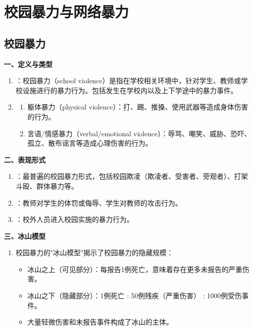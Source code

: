 \section{校园暴力与网络暴力}

\subsection{校园暴力}

\begin{keybox}
\textbf{一、定义与类型}
\begin{enumerate}[leftmargin=*]
    \item {}：校园暴力（school violence）是指在学校相关环境中，针对学生、教师或学校设施进行的暴力行为。包括发生在学校内以及上下学途中的暴力事件。
    \item {}
    \begin{enumerate}
        \item 躯体暴力（physical violence）：打、踢、推搡、使用武器等造成身体伤害的行为。
        \item 言语/情感暴力（verbal/emotional violence）：辱骂、嘲笑、威胁、恐吓、孤立、散布谣言等造成心理伤害的行为。
    \end{enumerate}
\end{enumerate}

\textbf{二、表现形式}
\begin{enumerate}[leftmargin=*]
    \item {}：最普遍的校园暴力形式，包括校园欺凌（欺凌者、受害者、旁观者）、打架斗殴、群体暴力等。
    \item {}：教师对学生的体罚或侮辱、学生对教师的攻击行为。
    \item {}：校外人员进入校园实施的暴力行为。
\end{enumerate}

\textbf{三、冰山模型}
\begin{enumerate}[leftmargin=*]
    \item 校园暴力的"冰山模型"揭示了校园暴力的隐藏规模：
    \begin{itemize}
        \item 冰山之上（可见部分）：每报告1例死亡，意味着存在更多未报告的严重伤害。
        \item 冰山之下（隐藏部分）：1例死亡 : 50例残疾（严重伤害） : 1000例受伤事件。
        \item 大量轻微伤害和未报告事件构成了冰山的主体。
    \end{itemize}
\end{enumerate}


\end{keybox}
